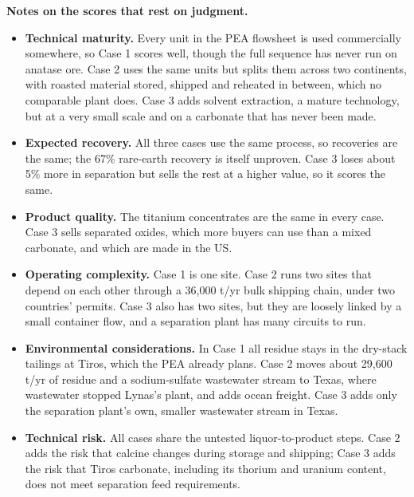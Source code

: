 \documentclass[11pt,letterpaper]{article}
\begin{document}
\textbf{Notes on the scores that rest on judgment.}
\begin{itemize}
\item \textbf{Technical maturity.} Every unit in the PEA flowsheet is used commercially somewhere, so Case 1 scores well, though the full sequence has never run on anatase ore. Case 2 uses the same units but splits them across two continents, with roasted material stored, shipped and reheated in between, which no comparable plant does. Case 3 adds solvent extraction, a mature technology, but at a very small scale and on a carbonate that has never been made.
\item \textbf{Expected recovery.} All three cases use the same process, so recoveries are the same; the 67\% rare-earth recovery is itself unproven. Case 3 loses about 5\% more in separation but sells the rest at a higher value, so it scores the same.
\item \textbf{Product quality.} The titanium concentrates are the same in every case. Case 3 sells separated oxides, which more buyers can use than a mixed carbonate, and which are made in the US.
\item \textbf{Operating complexity.} Case 1 is one site. Case 2 runs two sites that depend on each other through a 36,000 t/yr bulk shipping chain, under two countries' permits. Case 3 also has two sites, but they are loosely linked by a small container flow, and a separation plant has many circuits to run.
\item \textbf{Environmental considerations.} In Case 1 all residue stays in the dry-stack tailings at Tiros, which the PEA already plans. Case 2 moves about 29,600 t/yr of residue and a sodium-sulfate wastewater stream to Texas, where wastewater stopped Lynas's plant, and adds ocean freight. Case 3 adds only the separation plant's own, smaller wastewater stream in Texas.
\item \textbf{Technical risk.} All cases share the untested liquor-to-product steps. Case 2 adds the risk that calcine changes during storage and shipping; Case 3 adds the risk that Tiros carbonate, including its thorium and uranium content, does not meet separation feed requirements.
\end{itemize}
\end{document}
